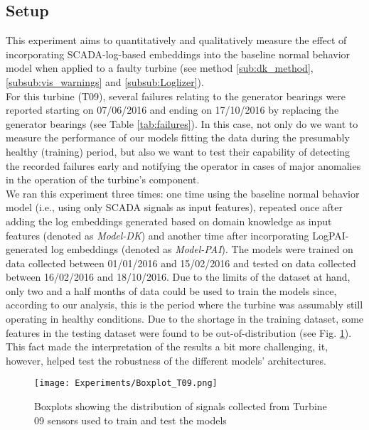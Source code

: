 \subsection{Setup}
This experiment aims to quantitatively and qualitatively measure 
the effect of incorporating SCADA-log-based embeddings into the baseline normal behavior model when applied to a faulty turbine 
(see method \ref{sub:dk_method}, \ref{subsub:vis_warnings} and \ref{subsub:Loglizer}).\\
For this turbine (T09), several failures relating to the generator bearings were reported starting on 07/06/2016 and ending on 17/10/2016
by replacing the generator bearings (see Table \ref{tab:failures}). In this case, not only do we want to measure the performance of our models fitting the data 
during the presumably healthy (training) period, but also we want to test their capability of detecting the recorded failures early and notifying the operator 
in cases of major anomalies in the operation of the turbine's component.\\
We ran this experiment three times: one time using the baseline normal behavior model (i.e., using only SCADA signals as input features), 
repeated once after adding the log embeddings generated based on domain knowledge as input features (denoted as \emph{Model-DK}) and 
another time after incorporating LogPAI-generated log embeddings (denoted as \emph{Model-PAI}).
The models were trained on data collected between 01/01/2016 and 15/02/2016 and tested on data collected between
16/02/2016 and 18/10/2016. Due to the limits of the dataset at hand, only two and a half months of data could be used to train the models since, 
according to our analysis, this is the period where the turbine was assumably still operating in healthy conditions.
Due to the shortage in the training dataset, some features in the testing dataset were found to be out-of-distribution (see Fig. \ref{fig:Boxplot_T09}). 
This fact made the interpretation of the results a bit more challenging, it, however, helped test the robustness of the 
different models' architectures.

\begin{figure}[H]
    \begin{center}
      \texttt{[image: Experiments/Boxplot\_T09.png]}
    \end{center}
    \caption{Boxplots showing the distribution of signals collected from Turbine 09 sensors used to train and test the models}
    \label{fig:Boxplot_T09}
  \end{figure}

